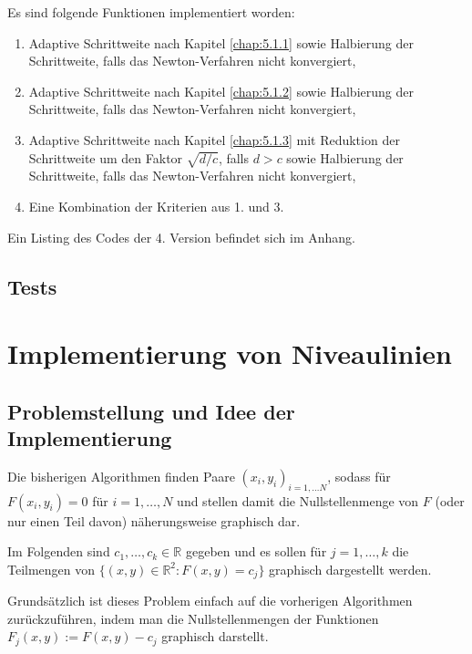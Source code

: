 \documentclass[a4paper,11pt,bibliography=totoc,listof=totoc,headinclude=true,cleardoublepage=empty,oneside]{scrartcl}
\newcommand{\R}{\mathbb{R}}
\begin{document}
Es sind folgende Funktionen implementiert worden:
\begin{enumerate}
	\item Adaptive Schrittweite nach Kapitel \ref{chap:5.1.1} sowie Halbierung der Schrittweite, falls das Newton-Verfahren nicht konvergiert,
	\item Adaptive Schrittweite nach Kapitel \ref{chap:5.1.2} sowie Halbierung der Schrittweite, falls das Newton-Verfahren nicht konvergiert,
	\item Adaptive Schrittweite nach Kapitel \ref{chap:5.1.3} mit Reduktion der Schrittweite um den Faktor $\sqrt{d/c}$, falls $d>c$ sowie Halbierung der Schrittweite, falls das Newton-Verfahren nicht konvergiert,
	\item Eine Kombination der Kriterien aus 1. und 3.
\end{enumerate}

Ein Listing des Codes der 4. Version befindet sich im Anhang. 

\subsection{Tests}


\section{Implementierung von Niveaulinien}
\subsection{Problemstellung und Idee der Implementierung}

Die bisherigen Algorithmen finden Paare $(x_i,y_i)_{i=1,\dots N}$, sodass für $F(x_i,y_i)=0$ für $i=1,\dots, N$ und stellen damit die Nullstellenmenge von $F$ (oder nur einen Teil davon) näherungsweise graphisch dar. 

Im Folgenden sind $c_1,\dots, c_k \in \R$ gegeben und es sollen für $j=1,\dots,k$ die Teilmengen von $\{ (x,y) \in \R^2 : F(x,y)=c_j \}$ graphisch dargestellt werden.

Grundsätzlich ist dieses Problem einfach auf die vorherigen Algorithmen zurückzuführen, indem man die Nullstellenmengen der Funktionen $F_j(x,y) := F(x,y) -c_j$ graphisch darstellt.
\end{document}
